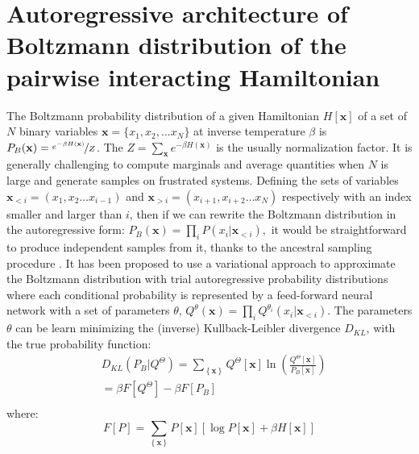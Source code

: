 \documentclass[aps,physrev,10pt,floatfix,reprint]{revtex4-2}
\begin{document}
\section{Autoregressive architecture of Boltzmann distribution of the pairwise interacting Hamiltonian}
\label{sec:ARNN_boltzmann}
The Boltzmann probability distribution of a given Hamiltonian $H[\mathbf{x}]$ of a set of $N$ binary variables $\mathbf{x}=\{x_1, x_2,...x_N\}$ at inverse temperature $\beta$ is $P_{B}(\mathbf{x}) = \nicefrac{e^{-\beta H\left(\mathbf{x}\right)}}{Z}$. The $Z=\sum_{\mathbf{x}}e^{-\beta H\left(\mathbf{x}\right)}$ is the usually normalization factor.
It is generally challenging to compute marginals and average quantities when $N$ is large and generate samples on frustrated systems. Defining the sets of variables $\mathbf{x}_{<i}=\left(x_{1},x_{2}\dots x_{i-1}\right)$ and $\mathbf{x}_{>i}=\left(x_{i+1},x_{i+2}\dots x_{N}\right)$ respectively with an index smaller and larger than $i$, then if we can rewrite the Boltzmann distribution in the autoregressive form:
$
P_{B}\left(\mathbf{x}\right)=\prod_{i}P\left(x_{i}|\mathbf{x}_{<i}\right),
$
it would be straightforward to produce independent samples from it, thanks to the ancestral sampling procedure \cite{Wu2019}. It has been proposed \cite{Wu2019} to use a variational approach to approximate the Boltzmann distribution with trial autoregressive probability distributions where each conditional probability is represented by a feed-forward neural network with a set of parameters ${\theta}$,
$
Q^{\theta}\left(\mathbf{x}\right)=\prod_{i}Q^{\theta_i}\left(x_{i}|\mathbf{x}_{<i}\right)
$.
The parameters ${\theta}$ can be learn minimizing the (inverse) Kullback-Leibler divergence $D_{KL}$,
with the true probability function:
\begin{equation}
\begin{split}
& D_{KL}\left(P_{B}|Q^{\Theta}\right) =  \sum_{\left\{ \mathbf{x} \right\} } Q^{\Theta} [\mathbf{x}]\ln\left(\frac{Q^{\Theta}[\mathbf{x}]}{P_{B}[\mathbf{x}]}\right)  \\
& = \beta F[Q^{\Theta}] - \beta F[P_{B}]\\
\end{split}
\label{eq:kl}    
\end{equation}
where:
$$F[P]= \sum_{\left\{ \mathbf{x} \right\}}P[\mathbf{x}]\left[\log P[\mathbf{x}] + \beta H[\mathbf{x}] \right] 
$$
\end{document}
